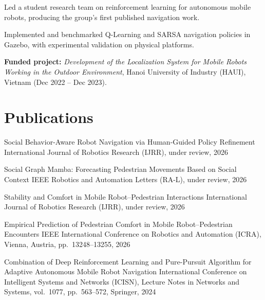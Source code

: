\documentclass[10pt]{article}
\begin{document}
\begin{achievements}
  \item Led a student research team on reinforcement learning for autonomous
        mobile robots, producing the group's first published navigation work.
  \item Implemented and benchmarked Q-Learning and SARSA navigation policies in
        Gazebo, with experimental validation on physical platforms.
\end{achievements}
\begin{detail}
{\fontsize{9}{11.5}\selectfont\textbf{Funded project:} \emph{Development of the
Localization System for Mobile Robots Working in the Outdoor Environment},
Hanoi University of Industry (HAUI), Vietnam (Dec 2022 -- Dec 2023).}
\end{detail}

\section{Publications}

    {Social Behavior-Aware Robot Navigation via Human-Guided Policy Refinement}
    {International Journal of Robotics Research (IJRR), under review, 2026}
    {}

    {Social Graph Mamba: Forecasting Pedestrian Movements Based on Social Context}
    {IEEE Robotics and Automation Letters (RA-L), under review, 2026}
    {}

    {Stability and Comfort in Mobile Robot--Pedestrian Interactions}
    {International Journal of Robotics Research (IJRR), under review, 2026}
    {}

    {Empirical Prediction of Pedestrian Comfort in Mobile Robot--Pedestrian Encounters}
    {IEEE International Conference on Robotics and Automation (ICRA), Vienna, Austria, pp.~13248--13255, 2026}
    {}

    {Combination of Deep Reinforcement Learning and Pure-Pursuit Algorithm for Adaptive Autonomous Mobile Robot Navigation}
    {International Conference on Intelligent Systems and Networks (ICISN), Lecture Notes in Networks and Systems, vol.~1077, pp.~563--572, Springer, 2024}
    {}
\end{document}
